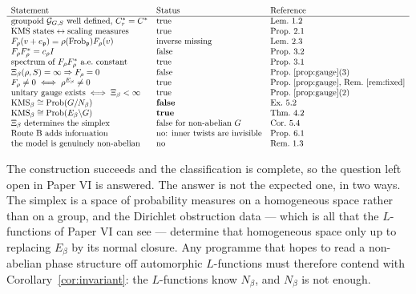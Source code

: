 \documentclass[11pt]{amsart}
\numberwithin{equation}{section}
\theoremstyle{definition}
\theoremstyle{remark}
\newcommand{\cG}{\mathcal{G}}
\newcommand{\pp}{\mathfrak{p}}
\newcommand{\Frob}{\operatorname{Frob}}
\newcommand{\Prob}{\operatorname{Prob}}
\begin{document}
\[
\begin{array}{lll}
\text{Statement} & \text{Status} & \text{Reference}\\\hline
\text{groupoid }\cG_{G,S}\text{ well defined, }C^*_r=C^*&\text{true}&\text{Lem.~1.2}\\
\text{KMS states}\leftrightarrow\text{scaling measures}&\text{true}&\text{Prop.~2.1}\\
F_\rho(v+e_\pp)=\rho(\Frob_\pp)F_\rho(v)&\text{inverse missing}&\text{Lem.~2.3}\\
F_\rho F_\rho^*=c_\rho I&\text{false}&\text{Prop.~3.2}\\
\text{spectrum of }F_\rho F_\rho^*\text{ a.e.\ constant}&\text{true}&\text{Prop.~3.1}\\
\Xi_\beta(\rho,S)=\infty\Rightarrow F_\rho=0&\text{false}&\text{Prop.~\ref{prop:gauge}(3)}\\
F_\rho\ne0\iff\rho^{E_\beta}\ne0&\text{true}&\text{Prop.~\ref{prop:gauge}, Rem.~\ref{rem:fixed}}\\
\text{unitary gauge exists}\iff\Xi_\beta<\infty&\text{true}&\text{Prop.~\ref{prop:gauge}(2)}\\
\mathrm{KMS}_\beta\cong\Prob(G/N_\beta)&\textbf{false}&\text{Ex.~5.2}\\
\mathrm{KMS}_\beta\cong\Prob(E_\beta\backslash G)&\textbf{true}&\text{Thm.~4.2}\\
\Xi_\beta\text{ determines the simplex}&\text{false for non-abelian }G&\text{Cor.~5.4}\\
\text{Route B adds information}&\text{no: inner twists are invisible}&\text{Prop.~6.1}\\
\text{the model is genuinely non-abelian}&\text{no}&\text{Rem.~1.3}
\end{array}
\]

The construction succeeds and the classification is complete, so the question left open in
Paper VI is answered. The answer is not the expected one, in two ways. The simplex
is a space of probability measures on a homogeneous space rather than on a group, and the
Dirichlet obstruction data --- which is all that the $L$-functions of Paper VI can
see --- determine that homogeneous space only up to replacing $E_\beta$ by its normal
closure. Any programme that hopes to read a non-abelian phase structure off automorphic
$L$-functions must therefore contend with Corollary~\ref{cor:invariant}: the $L$-functions
know $N_\beta$, and $N_\beta$ is not enough.
\end{document}
